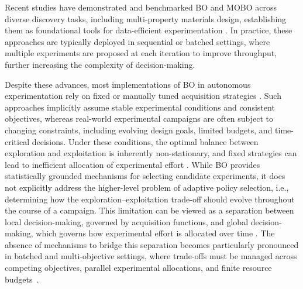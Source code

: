 Recent studies have demonstrated and benchmarked BO and MOBO across diverse discovery tasks, including multi-property materials design, establishing them as foundational tools for data-efficient experimentation \cite{liang2021benchmarking,wang2022benchmarking,arroyave2022perspective,adesiji2026benchmarking, desimpel2026bayesian, padhy2024experimentally}. In practice, these approaches are typically deployed in sequential or batched settings, where multiple experiments are proposed at each iteration to improve throughput, further increasing the complexity of decision-making.

Despite these advances, most implementations of BO in autonomous experimentation rely on fixed or manually tuned acquisition strategies \cite{de2021greed}. Such approaches implicitly assume stable experimental conditions and consistent objectives, whereas real-world experimental campaigns are often subject to changing constraints, including evolving design goals, limited budgets, and time-critical decisions. Under these conditions, the optimal balance between exploration and exploitation is inherently non-stationary, and fixed strategies can lead to inefficient allocation of experimental effort \cite{hoffman2011portfolio}. While BO provides statistically grounded mechanisms for selecting candidate experiments, it does not explicitly address the higher-level problem of adaptive policy selection, i.e., determining how the exploration–exploitation trade-off should evolve throughout the course of a campaign. This limitation can be viewed as a separation between local decision-making, governed by acquisition functions, and global decision-making, which governs how experimental effort is allocated over time \cite{armesto2023acquisition}. The absence of mechanisms to bridge this separation becomes particularly pronounced in batched and multi-objective settings, where trade-offs must be managed across competing objectives, parallel experimental allocations, and finite resource budgets~\cite{Daulton2020}.

